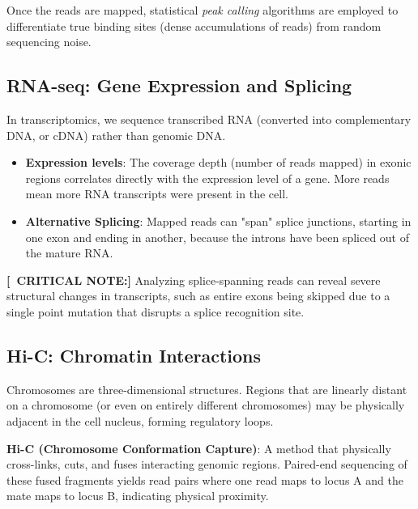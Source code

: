 \documentclass[11pt,a4paper]{article}
\newenvironment{important}{
    \vspace{1em}
    \begin{tcolorbox}[colback=blue!5!white, colframe=blue!75!black, boxrule=1pt, arc=4pt, left=10pt, right=10pt, top=10pt, bottom=10pt]
}{
    \end{tcolorbox}
    \vspace{1em}
}
\newcommand{\sta}{\textbf{[\textasteriskcentered\ CRITICAL NOTE:] }}
\begin{document}
Once the reads are mapped, statistical \textit{peak calling} algorithms are employed to differentiate true binding sites (dense accumulations of reads) from random sequencing noise.

\subsection{RNA-seq: Gene Expression and Splicing}
In transcriptomics, we sequence transcribed RNA (converted into complementary DNA, or cDNA) rather than genomic DNA.

\begin{itemize}
    \item \textbf{Expression levels}: The coverage depth (number of reads mapped) in exonic regions correlates directly with the expression level of a gene. More reads mean more RNA transcripts were present in the cell.
    \item \textbf{Alternative Splicing}: Mapped reads can "span" splice junctions, starting in one exon and ending in another, because the introns have been spliced out of the mature RNA.
\end{itemize}

\sta Analyzing splice-spanning reads can reveal severe structural changes in transcripts, such as entire exons being skipped due to a single point mutation that disrupts a splice recognition site.

\subsection{Hi-C: Chromatin Interactions}
Chromosomes are three-dimensional structures. Regions that are linearly distant on a chromosome (or even on entirely different chromosomes) may be physically adjacent in the cell nucleus, forming regulatory loops.

\begin{important}
  \textbf{Hi-C (Chromosome Conformation Capture)}: A method that physically cross-links, cuts, and fuses interacting genomic regions. Paired-end sequencing of these fused fragments yields read pairs where one read maps to locus A and the mate maps to locus B, indicating physical proximity.
\end{important}
\end{document}
